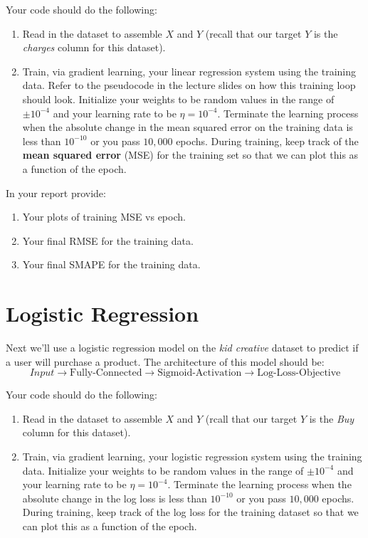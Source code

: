 \documentclass[12pt]{article}
\begin{document}
\noindent
Your code should do the following:
\begin{enumerate}
\item Read in the dataset to assemble $X$ and $Y$ (recall that our target $Y$ is the \emph{charges} column for this dataset).
\item Train, via gradient learning, your linear regression system using the training data.  Refer to the pseudocode in the lecture slides on how this training loop should look.  Initialize your weights to be random values in the range of $\pm 10^{-4}$ and your learning rate to be $\eta=10^{-4}$.  Terminate the learning process when the absolute change in the mean squared error on the training data is less than $10^{-10}$ or you pass $10,000$ epochs.  During training, keep track of the \textbf{mean squared error}  (MSE) for the training set so that we can plot this as a function of the epoch.
\end{enumerate}

\noindent
In your report provide:
\begin{enumerate}
\item Your plots of training MSE vs epoch.
\item Your final RMSE for the training data.
\item Your final SMAPE for the training data.
\end{enumerate}

\newpage
\section{Logistic Regression}\label{linreg}
Next we'll use a logistic regression model on the \emph{kid creative} dataset to predict if a user will purchase a product.   The architecture of this model should be:
$$Input \rightarrow \textrm{Fully-Connected} \rightarrow \textrm{Sigmoid-Activation} \rightarrow \textrm{Log-Loss-Objective}$$

\noindent
Your code should do the following:
\begin{enumerate}
\item Read in the dataset to assemble $X$ and $Y$ (rcall that our target $Y$ is the \emph{Buy} column for this dataset).
\item Train, via gradient learning, your logistic regression system using the training data.  Initialize your weights to be random values in the range of $\pm 10^{-4}$ and your learning rate to be $\eta=10^{-4}$.  Terminate the learning process when the absolute change in the log loss  is less than $10^{-10}$ or you pass $10,000$ epochs.  During training, keep track of the log loss for the training dataset so that we can plot this as a function of the epoch.
\end{enumerate}
\end{document}
